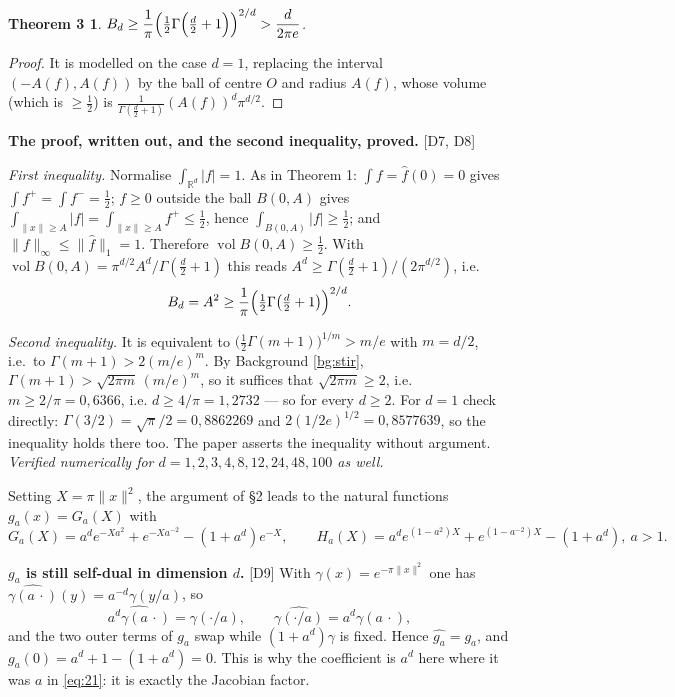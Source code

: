 \documentclass[11pt,reqno]{amsart}
\theoremstyle{plain}
\newtheorem*{thmC}{Theorem 3}
\theoremstyle{definition}
\theoremstyle{remark}
\newcommand{\R}{\mathbb{R}}
\newcommand{\fh}{\widehat{f}}
\newcommand{\Ledger}[1]{{\scriptsize\textsf{[#1]}}}
\begin{document}
\begin{thmC}
$\displaystyle B_d\ge\frac1\pi\Bigl(\tfrac12\Gamma\Bigl(\tfrac d2+1\Bigr)\Bigr)^{2/d}
 >\frac{d}{2\pi e}$.
\end{thmC}

\begin{proof}
It is modelled on the case $d=1$, replacing the interval $(-A(f),A(f))$ by the ball of
centre $O$ and radius $A(f)$, whose volume (which is $\ge\tfrac12$) is
$\frac1{\Gamma(\frac d2+1)}(A(f))^d\pi^{d/2}$.
\end{proof}

\begin{filled}
\textbf{The proof, written out, and the second inequality, proved.}
\Ledger{D7, D8}

\emph{First inequality.} Normalise $\int_{\R^d}|f|=1$. As in Theorem 1:
$\int f=\fh(0)=0$ gives $\int f^+=\int f^-=\tfrac12$; $f\ge0$ outside the ball
$B(0,A)$ gives $\int_{\|x\|\ge A}|f|=\int_{\|x\|\ge A}f^+\le\tfrac12$, hence
$\int_{B(0,A)}|f|\ge\tfrac12$; and $\|f\|_\infty\le\|\fh\|_1=1$. Therefore
$\operatorname{vol}B(0,A)\ge\tfrac12$. With
$\operatorname{vol}B(0,A)=\pi^{d/2}A^d/\Gamma(\frac d2+1)$ this reads
$A^d\ge\Gamma(\frac d2+1)/(2\pi^{d/2})$, i.e.
\[B_d=A^2\ge\frac1\pi\Bigl(\tfrac12\Gamma\bigl(\tfrac d2+1\bigr)\Bigr)^{2/d}.\]

\emph{Second inequality.} It is equivalent to
$\bigl(\tfrac12\Gamma(m+1)\bigr)^{1/m}>m/e$ with $m=d/2$, i.e.\ to
$\Gamma(m+1)>2(m/e)^m$. By Background \ref{bg:stir},
$\Gamma(m+1)>\sqrt{2\pi m}\,(m/e)^m$, so it suffices that $\sqrt{2\pi m}\ge2$, i.e.
$m\ge2/\pi=0{,}6366$, i.e. $d\ge4/\pi=1{,}2732$ --- so for every $d\ge2$. For $d=1$
check directly: $\Gamma(3/2)=\sqrt\pi/2=0{,}8862269$ and
$2(1/2e)^{1/2}=0{,}8577639$, so the inequality holds there too. The paper asserts the
inequality without argument. \emph{Verified numerically for
$d=1,2,3,4,8,12,24,48,100$ as well.}
\end{filled}

Setting $X=\pi\|x\|^2$, the argument of \S2 leads to the natural functions
$g_a(x)=G_a(X)$ with
\[G_a(X)=a^de^{-Xa^2}+e^{-Xa^{-2}}-(1+a^d)e^{-X},\qquad
  H_a(X)=a^de^{(1-a^2)X}+e^{(1-a^{-2})X}-(1+a^d),\ a>1 .\]
\begin{expansion}
\textbf{$g_a$ is still self-dual in dimension $d$.} \Ledger{D9} With
$\gamma(x)=e^{-\pi\|x\|^2}$ one has $\widehat{\gamma(a\,\cdot)}(y)=a^{-d}\gamma(y/a)$,
so
\[\widehat{a^d\gamma(a\,\cdot)}=\gamma(\cdot/a),\qquad
  \widehat{\gamma(\cdot/a)}=a^d\gamma(a\,\cdot),\]
and the two outer terms of $g_a$ swap while $(1+a^d)\gamma$ is fixed. Hence
$\widehat{g_a}=g_a$, and $g_a(0)=a^d+1-(1+a^d)=0$. This is why the coefficient is
$a^d$ here where it was $a$ in \eqref{eq:21}: it is exactly the Jacobian factor.
\end{expansion}
\end{document}
